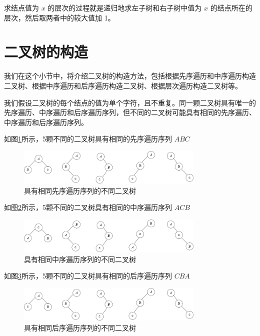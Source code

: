 \documentclass[lang=cn,newtx,10pt,scheme=chinese]{../elegantbook}
\begin{document}
求结点值为 $x$ 的层次的过程就是递归地求左子树和右子树中值为 $x$ 的结点所在的层次，然后取两者中的较大值加 1。


\section{二叉树的构造}

我们在这个小节中，将介绍二叉树的构造方法，包括根据先序遍历和中序遍历构造二叉树、根据中序遍历和后序遍历构造二叉树、根据层次遍历构造二叉树等。

我们假设二叉树的每个结点的值为单个字符，且不重复。同一颗二叉树具有唯一的先序遍历、中序遍历和后序遍历序列，但不同的二叉树可能具有相同的先序遍历、中序遍历和后序遍历序列。

如图\ref{fig:samePre}所示，5颗不同的二叉树具有相同的先序遍历序列 $ABC$

\begin{figure}[!htbp]
  \centering
  \includegraphics[width=0.8\textwidth]{./figure/fix/pdf/preBTree.pdf}
  \caption{具有相同先序遍历序列的不同二叉树}
  \label{fig:samePre}
\end{figure}


如图\ref{fig:sameIn}所示，5颗不同的二叉树具有相同的中序遍历序列 $ACB$

\begin{figure}[!htbp]
  \centering
  \includegraphics[width=0.8\textwidth]{./figure/fix/pdf/inBTree.pdf}
  \caption{具有相同中序遍历序列的不同二叉树}
  \label{fig:sameIn}
\end{figure}

如图\ref{fig:samePost}所示，5颗不同的二叉树具有相同的后序遍历序列 $CBA$

\begin{figure}[!htbp]
  \centering
  \includegraphics[width=0.8\textwidth]{./figure/fix/pdf/postBTree.pdf}
  \caption{具有相同后序遍历序列的不同二叉树}
  \label{fig:samePost}
\end{figure}
\end{document}
